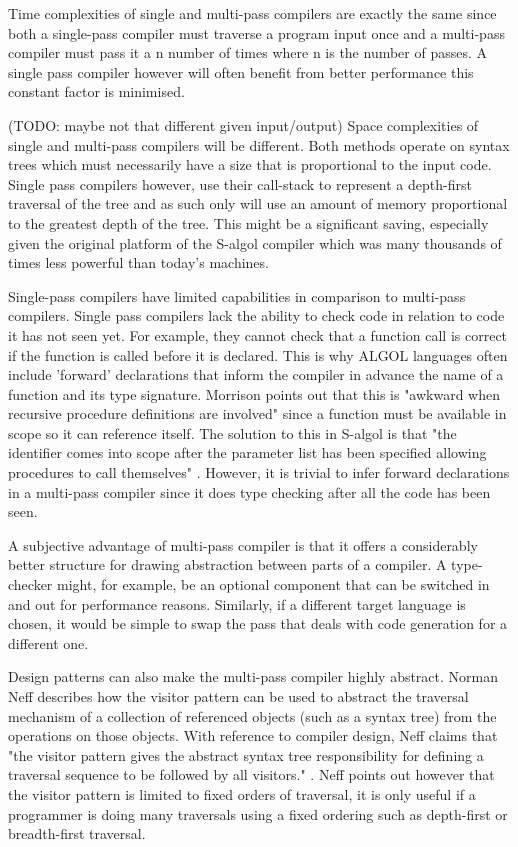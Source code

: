 \documentclass{article}
\begin{document}
Time complexities of single and multi-pass compilers are exactly the same since both a single-pass compiler must traverse a program input once and a multi-pass compiler must pass it a n number of times where n is the number of passes. A single pass compiler however will often benefit from better performance this constant factor is minimised.

(TODO: maybe not that different given input/output) Space complexities of single and multi-pass compilers will be different. Both methods operate on syntax trees which must necessarily have a size that is proportional to the input code. Single pass compilers however, use their call-stack to represent a depth-first traversal of the tree and as such only will use an amount of memory proportional to the greatest depth of the tree. This might be a significant saving, especially given the original platform of the S-algol compiler which was many thousands of times less powerful than today's machines.

Single-pass compilers have limited capabilities in comparison to multi-pass compilers. Single pass compilers lack the ability to check code in relation to code it has not seen yet. For example, they cannot check that a function call is correct if the function is called before it is declared. This is why ALGOL languages often include 'forward' declarations that inform the compiler in advance the name of a function and its type signature. Morrison points out that this is "awkward when recursive procedure definitions are involved" since a function must be available in scope so it can reference itself. The solution to this in S-algol is that "the identifier comes into scope after the parameter list has been specified allowing procedures to call themselves" \cite{morrison1979development}. However, it is trivial to infer forward declarations in a multi-pass compiler since it does type checking after all the code has been seen.

A subjective advantage of multi-pass compiler is that it offers a considerably better structure for drawing abstraction between parts of a compiler. A type-checker might, for example, be an optional component that can be switched in and out for performance reasons. Similarly, if a different target language is chosen, it would be simple to swap the pass that deals with code generation for a different one.

Design patterns can also make the multi-pass compiler highly abstract. Norman Neff describes how the visitor pattern can be used to abstract the traversal mechanism of a collection of referenced objects (such as a syntax tree) from the operations on those objects. With reference to compiler design, Neff claims that "the visitor pattern gives the abstract syntax tree responsibility for defining a traversal sequence to be followed by all visitors." \cite{neff1999oo}. Neff points out however that the visitor pattern is limited to fixed orders of traversal, it is only useful if a programmer is doing many traversals using a fixed ordering such as depth-first or breadth-first traversal. 
\end{document}
